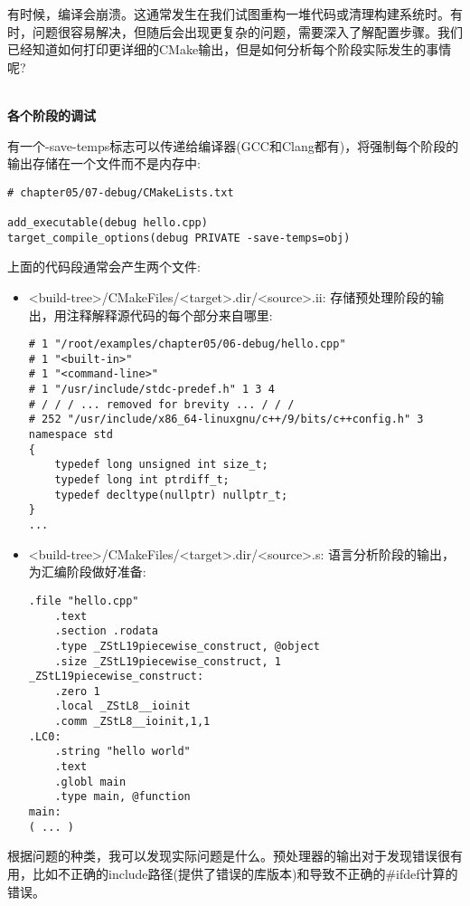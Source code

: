 有时候，编译会崩溃。这通常发生在我们试图重构一堆代码或清理构建系统时。有时，问题很容易解决，但随后会出现更复杂的问题，需要深入了解配置步骤。我们已经知道如何打印更详细的CMake输出，但是如何分析每个阶段实际发生的事情呢?

\hspace*{\fill} \\ %
\noindent
\textbf{各个阶段的调试}

有一个-save-temps标志可以传递给编译器(GCC和Clang都有)，将强制每个阶段的输出存储在一个文件而不是内存中:

\begin{lstlisting}[style=styleCMake]
# chapter05/07-debug/CMakeLists.txt

add_executable(debug hello.cpp)
target_compile_options(debug PRIVATE -save-temps=obj)
\end{lstlisting}

上面的代码段通常会产生两个文件:

\begin{itemize}
\item 
<build-tree>/CMakeFiles/<target>.dir/<source>.ii: 存储预处理阶段的输出，用注释解释源代码的每个部分来自哪里:

\begin{lstlisting}[style=styleCXX]
# 1 "/root/examples/chapter05/06-debug/hello.cpp"
# 1 "<built-in>"
# 1 "<command-line>"
# 1 "/usr/include/stdc-predef.h" 1 3 4
# / / / ... removed for brevity ... / / /
# 252 "/usr/include/x86_64-linuxgnu/c++/9/bits/c++config.h" 3
namespace std
{
	typedef long unsigned int size_t;
	typedef long int ptrdiff_t;
	typedef decltype(nullptr) nullptr_t;
}
...
\end{lstlisting}
	
\item 
<build-tree>/CMakeFiles/<target>.dir/<source>.s: 语言分析阶段的输出，为汇编阶段做好准备:

\begin{lstlisting}[style=styleCXX]
	.file "hello.cpp"
	.text
	.section .rodata
	.type _ZStL19piecewise_construct, @object
	.size _ZStL19piecewise_construct, 1
_ZStL19piecewise_construct:
	.zero 1
	.local _ZStL8__ioinit
	.comm _ZStL8__ioinit,1,1
.LC0:
	.string "hello world"
	.text
	.globl main
	.type main, @function
main:
( ... )
\end{lstlisting}

\end{itemize}

根据问题的种类，我可以发现实际问题是什么。预处理器的输出对于发现错误很有用，比如不正确的include路径(提供了错误的库版本)和导致不正确的\#ifdef计算的错误。

